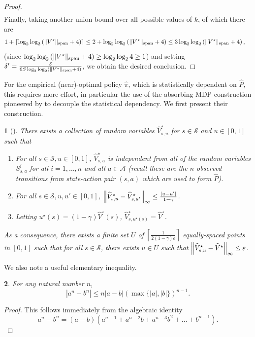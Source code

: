 \documentclass{article}
\theoremstyle{plain}
\newtheorem{thm}{\protect\theoremname}
\theoremstyle{plain}
\newtheorem{lem}[thm]{\protect\lemmaname}
\theoremstyle{remark}
\theoremstyle{plain}
\theoremstyle{plain}
\providecommand{\lemmaname}{Lemma}
\providecommand{\theoremname}{Theorem}
\newcommand{\Phat}{\widehat{P}}
\newcommand{\pihat}{\widehat{\pi}}
\newcommand{\Vhatstar}{\widehat{V}^\star}
\newcommand{\A}{\mathcal{A}}
\renewcommand{\S}{\mathcal{S}}
\begin{document}
\begin{proof}
\begin{align*}
    \end{align*}
    Finally, taking another union bound over all possible values of $k$, of which there are
    \begin{align*}
        1+\left\lceil\log_2 \log_2 \left( \Vert V^\star\Vert _{\textnormal{span}} + 4\right) \right\rceil &\leq 2 + \log_2 \log_2 \left( \Vert V^\star\Vert _{\textnormal{span}} + 4\right)  \leq 3 \log_2 \log_2 \left(\Vert V^\star\Vert _{\textnormal{span}} +4\right),
    \end{align*}
    (since $\log_2 \log_2 \left(\Vert V^\star\Vert _{\textnormal{span}} +4\right) \geq \log_2 \log_2 4 \geq 1$) and setting $\delta' = \frac{ \delta}{6 S \log_2 \log_2 \left(\Vert V^\star\Vert _{\textnormal{span}} +4\right)}$, we obtain the desired conclusion.
\end{proof}

For the empirical (near)-optimal policy $\pihat$, which is statistically dependent on $\Phat$, this requires more effort, in particular the use of the absorbing MDP construction pioneered by \cite{agarwal_model-based_2020} to decouple the statistical dependency. We first present their construction.

\begin{thm}[\cite{agarwal_model-based_2020}]
\label{thm:agarwal_LOO_construction}
    There exists a collection of random variables $\Vhatstar_{s,u}$ for $s \in \S$ and $u \in [0,1]$ such that
    \begin{enumerate}
        \item For all $s \in \S, u \in [0,1]$, $\Vhatstar_{s,u}$ is independent from all of the random variables $S^{i}_{s,a}$ for all $i = 1, \dots, n$ and all $a \in \A$ (recall these are the $n$ observed transitions from state-action pair $(s,a)$ which are used to form $\Phat$).
        \item For all $s \in \S, u,u' \in [0,1]$, $\infnorm{\Vhatstar_{s,u} - \Vhatstar_{s,u'}} \leq \frac{|u-u'|}{1-\gamma}$.
        \item Letting $u^\star(s) = (1-\gamma)\Vhatstar(s)$, $\Vhatstar_{s,u^\star(s)} = \Vhatstar$.
    \end{enumerate}
    As a consequence, there exists a finite set $U$ of $\left\lceil \frac{1}{2(1-\gamma)\varepsilon} \right\rceil$ equally-spaced points in $[0,1]$ such that for all $s \in \S$, there exists $u \in U$ such that $\infnorm{\Vhatstar_{s, u} - \Vhatstar} \leq \varepsilon$.
\end{thm}

We also note a useful elementary inequality.
\begin{lem}
\label{lem:difference_of_powers}
For any natural number $n$,
    \[\left| a^n - b^n\right| \leq n|a-b| \left(\max\{|a|, |b|\} \right)^{n-1}.\]
\end{lem}
\begin{proof}
This follows immediately from the algebraic identity
    \[
    a^n - b^n = (a-b)(a^{n-1} + a^{n-2}b + a^{n-3}b^2 + \dots + b^{n-1}).
    \]
\end{proof}
\end{document}
